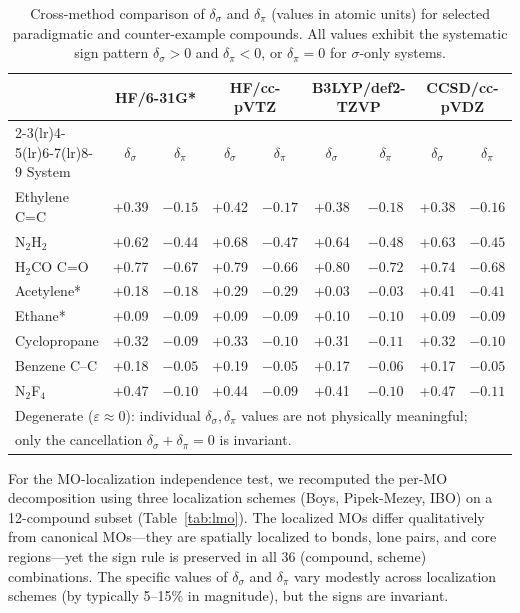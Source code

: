 \documentclass[twoside,natbib]{svjour3}
\newcommand{\delsg}{\delta_{\sigma}}
\newcommand{\delpi}{\delta_{\pi}}
\newcommand{\eps}{\varepsilon}
\begin{document}
\begin{table}[t]
\centering
\caption{Cross-method comparison of $\delsg$ and $\delpi$
(values in atomic units) for selected paradigmatic and counter-example
compounds. All values exhibit the systematic sign pattern $\delsg > 0$
and $\delpi < 0$, or $\delpi = 0$ for $\sigma$-only systems.}
\label{tab:methods}
\begin{tabular}{lcccccccc}
\toprule
& \multicolumn{2}{c}{HF/6-31G*} & \multicolumn{2}{c}{HF/cc-pVTZ} & \multicolumn{2}{c}{B3LYP/def2-TZVP} & \multicolumn{2}{c}{CCSD/cc-pVDZ} \\
\cmidrule(lr){2-3}\cmidrule(lr){4-5}\cmidrule(lr){6-7}\cmidrule(lr){8-9}
System & $\delsg$ & $\delpi$ & $\delsg$ & $\delpi$ & $\delsg$ & $\delpi$ & $\delsg$ & $\delpi$ \\
\midrule
Ethylene C=C   & +0.39 & $-0.15$ & +0.42 & $-0.17$ & +0.38 & $-0.18$ & +0.38 & $-0.16$ \\
N$_2$H$_2$     & +0.62 & $-0.44$ & +0.68 & $-0.47$ & +0.64 & $-0.48$ & +0.63 & $-0.45$ \\
H$_2$CO C=O    & +0.77 & $-0.67$ & +0.79 & $-0.66$ & +0.80 & $-0.72$ & +0.74 & $-0.68$ \\
Acetylene*     & +0.18 & $-0.18$ & +0.29 & $-0.29$ & +0.03 & $-0.03$ & +0.41 & $-0.41$ \\
Ethane*        & +0.09 & $-0.09$ & +0.09 & $-0.09$ & +0.10 & $-0.10$ & +0.09 & $-0.09$ \\
Cyclopropane   & +0.32 & $-0.09$ & +0.33 & $-0.10$ & +0.31 & $-0.11$ & +0.32 & $-0.10$ \\
Benzene C--C   & +0.18 & $-0.05$ & +0.19 & $-0.05$ & +0.17 & $-0.06$ & +0.17 & $-0.05$ \\
N$_2$F$_4$     & +0.47 & $-0.10$ & +0.44 & $-0.09$ & +0.41 & $-0.10$ & +0.47 & $-0.11$ \\
\bottomrule
\multicolumn{9}{l}{\footnotesize *Degenerate ($\eps \approx 0$): individual $\delsg, \delpi$ values are not physically meaningful;}\\
\multicolumn{9}{l}{\footnotesize \phantom{*}only the cancellation $\delsg + \delpi = 0$ is invariant.}
\end{tabular}
\end{table}

For the MO-localization independence test, we recomputed the per-MO
decomposition using three localization schemes (Boys, Pipek-Mezey,
IBO) on a 12-compound subset (Table~\ref{tab:lmo}). The localized
MOs differ qualitatively from canonical MOs---they are spatially
localized to bonds, lone pairs, and core regions---yet the sign
rule is preserved in all 36 (compound, scheme) combinations. The
specific values of $\delsg$ and $\delpi$ vary modestly across
localization schemes (by typically 5--15\% in magnitude), but
the signs are invariant.
\end{document}
